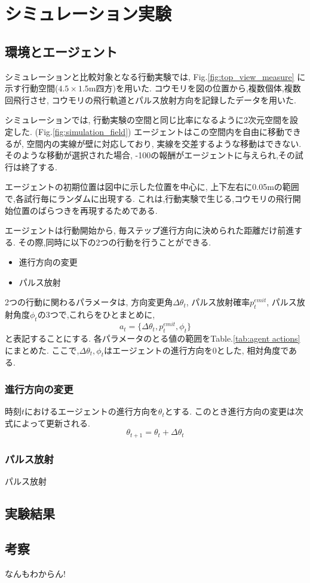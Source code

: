 \documentclass[../main]{subfiles}
\begin{document}
\newpage
\chapter{シミュレーション実験}
\label{chap:simulation}

\section{環境とエージェント}
シミュレーションと比較対象となる行動実験では,
Fig.\ref{fig:top_view_measure}
に示す行動空間($4.5 \times 1.5$\si{m}四方)を用いた.
コウモリを図の位置から,複数個体,複数回飛行させ,
コウモリの飛行軌道とパルス放射方向を記録したデータを用いた.

シミュレーションでは, 行動実験の空間と同じ比率になるように2次元空間を設定した.
(Fig.\ref{fig:simulation_field})
エージェントはこの空間内を自由に移動できるが,
空間内の実線が壁に対応しており,
実線を交差するような移動はできない.
そのような移動が選択された場合, 
-100の報酬がエージェントに与えられ,その試行は終了する.

エージェントの初期位置は図中に示した位置を中心に,
上下左右に0.05\si{m}の範囲で,各試行毎にランダムに出現する.
これは,行動実験で生じる,コウモリの飛行開始位置のばらつきを再現するためである.

エージェントは行動開始から, 毎ステップ進行方向に決められた距離だけ前進する.
その際,同時に以下の2つの行動を行うことができる.
\begin{itemize}
    \item 進行方向の変更
    \item パルス放射
\end{itemize}
2つの行動に関わるパラメータは,
方向変更角$\Delta\theta_t$,
パルス放射確率$p^{emit}_t$,
パルス放射角度$\phi_t$の3つで,これらをひとまとめに,
$$a_t=\{\Delta\theta_t, p^{emit}_t, \phi_t \}$$
と表記することにする.
各パラメータのとる値の範囲をTable.\ref{tab:agent actions}にまとめた.
ここで,$\Delta\theta_t, \phi_t$はエージェントの進行方向を0とした,
相対角度である.


\subsection{進行方向の変更}
時刻$t$におけるエージェントの進行方向を$\theta_t$とする.
このとき進行方向の変更は次式によって更新される.
$$\theta_{t+1}=\theta_t+\Delta\theta_t$$

\subsection{パルス放射}
パルス放射



\section{実験結果}
\section{考察}
なんもわからん!
\end{document}
